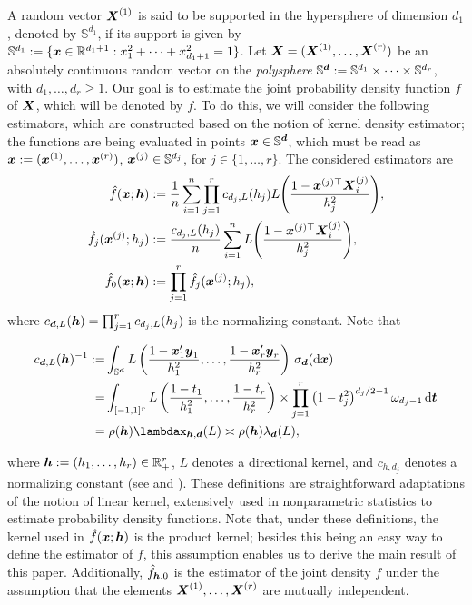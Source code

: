 \documentclass[oneside,11pt]{article}
\begin{document}
%
A random vector $\boldsymbol{X}^{(1)}$ is said to be supported in the hypersphere of dimension $d_1$, denoted by $\mathbb{S}^{d_1}$, if its support is given by $\mathbb{S}^{d_1} := \{ \boldsymbol{x} \in \mathbb{R}^{d_1+1} : x_1^2 + \dots + x_{d_1 + 1}^2 = 1 \}$. Let $\boldsymbol{X} = (\boldsymbol{X}^{(1)}, \dots, \boldsymbol{X}^{(r)})$ be an absolutely continuous random vector on the \emph{polysphere} $\mathbb{S}^{\boldsymbol{d}} := \mathbb{S}^{d_1} \times \dots \times \mathbb{S}^{d_r}$, with $d_1,\ldots,d_r\geq 1$. Our goal is to estimate the joint probability density function $f$ of $\boldsymbol{X}$, which will be denoted by $f$. To do this, we will consider the following estimators, which are constructed based on the notion of kernel density estimator; the functions are being evaluated in points $\boldsymbol{x}\in\mathbb{S}^{\boldsymbol{d}}$, which must be read as $\boldsymbol{x} := (\boldsymbol{x}^{(1)}, \dots, \boldsymbol{x}^{(r)})$, $\boldsymbol{x}^{(j)} \in \mathbb{S}^{d_j}$, for $j \in \{ 1, \dots, r \}$. The considered estimators are
\begin{align}
    \hat{f}(\boldsymbol{x};{\boldsymbol{h}}) &:= \frac{1}{n} \sum_{i=1}^{n} \prod_{j=1}^{r} c_{d_j,L}(h_j)L \Bigg( \frac{1 - \boldsymbol{x}^{(j)\top} \boldsymbol{X}_i^{(j)}}{h_j^2} \Bigg),\label{eq:estimator} \\
    \hat{f}_{j}(\boldsymbol{x}^{(j)};h_j) &:= \frac{c_{d_j,L}(h_j)}{n} \sum_{i=1}^{n} L \Bigg( \frac{1 - \boldsymbol{x}^{(j)\top} \boldsymbol{X}_i^{(j)}}{h_j^2} \Bigg),\\
    \hat{f}_{0}(\boldsymbol{x};{\boldsymbol{h}}) &:= \prod_{j=1}^{r} \hat{f}_{j}(\boldsymbol{x}^{(j)};h_j),
\end{align}
where $c_{\boldsymbol{d},L}({\boldsymbol{h}})=\prod_{j=1}^{r} c_{d_j,L}(h_j)$ is the normalizing constant. Note that 

\begin{align}
    c_{\bd,L}(\bh)^{-1}\defin&\int_{\Sr}L\lrp{\frac{1-\bx_1' \by_1}{h_1^2},\ldots, \frac{1-\bx_r' \by_r}{h_r^2}}\,\sigmar(\rd\bx)\nonumber\\
    =&\int_{[-1,1]^r}L\lrp{\frac{1-t_1}{h_1^2},\ldots, \frac{1-t_r}{h_r^2}}\times \prod_{j=1}^r \left(1-t_j^2\right)^{d_j/2-1}\om{d_j-1}\,\rd \bt   \nonumber \\
    =&\; \rho(\bh) \lambdax_{\bh,\bd}(L)\asymp \rho(\bh)\lambda_{\bd}(L),\label{eq:equiv}
\end{align}


 where ${\boldsymbol{h}} := (h_1, \dots, h_r)\in\mathbb{R}_+^r$, $L$ denotes a directional kernel, and $c_{h,d_j}$ denotes a normalizing constant (see \cite{Garcia-Portugues2024} and \cite{Garcia-Portugues2015}). These definitions are straightforward adaptations of the notion of linear kernel, extensively used in nonparametric statistics to estimate probability density functions. Note that, under these definitions, the kernel used in $ \hat{f}(\boldsymbol{x};{\boldsymbol{h}})$ is the product kernel; besides this being an easy way to define the estimator of $f$, this assumption enables us to derive the main result of this paper. Additionally, $\hat{f}_{{\boldsymbol{h}},0}$ is the estimator of the joint density $f$ under the assumption that the elements $\boldsymbol{X}^{(1)}, \dots, \boldsymbol{X}^{(r)}$ are mutually independent.
\end{document}

